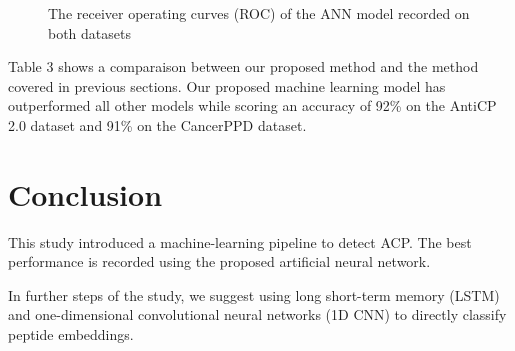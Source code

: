 \documentclass[twocolumn]{article}
\begin{document}
\begin{figure}[h!]
  \centering
  \quad
  \quad
  \caption{The receiver operating curves (ROC) of the ANN model recorded on both datasets}
\end{figure}

Table 3 shows a comparaison between our proposed method and the method covered in previous sections. Our proposed machine learning model has outperformed all other models while scoring an accuracy of 92\% on the AntiCP 2.0 dataset and 91\% on the CancerPPD dataset. 

\begin{table}[h!]
  \centering
  \caption{A comparaison between our proposed method and other studies}
  \label{table:2}
\end{table}


\section{Conclusion}
This study introduced a machine-learning pipeline to detect ACP. The best performance is recorded using the proposed artificial neural network.

In further steps of the study, we suggest using long short-term memory (LSTM) and one-dimensional convolutional neural networks (1D CNN) to directly classify peptide embeddings.




\end{document}
